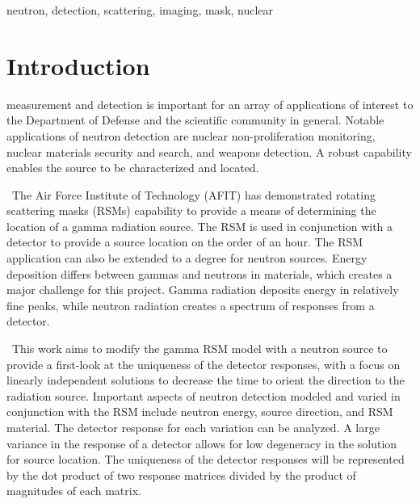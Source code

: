 \documentclass[journal]{IEEEtran}
\begin{document}
	\begin{IEEEkeywords}
		neutron, detection, scattering, imaging, mask, nuclear
	\end{IEEEkeywords}
	
	
	\IEEEpeerreviewmaketitle
	
	\section{Introduction}
	 measurement and detection is important for an array of applications of interest to the Department of Defense and the scientific community in general.  Notable applications of neutron detection are nuclear non-proliferation monitoring, nuclear materials security and search, and weapons detection.  A robust capability enables the source to be characterized and located. 
	
	\ The Air Force Institute of Technology (AFIT) has demonstrated rotating scattering masks (RSMs) capability to provide a means of determining the location of a gamma radiation source.  The RSM is used in conjunction with a detector to provide a source location on the order of an hour. The RSM application can also be extended to a degree for neutron sources.  Energy deposition differs between gammas and neutrons in materials, which creates a major challenge for this project.  Gamma radiation deposits energy in relatively fine peaks, while neutron radiation creates a spectrum of responses from a detector. 
	
	\ This work aims to modify the gamma RSM model with a neutron source to provide a first-look at the uniqueness of the detector responses, with a focus on linearly independent solutions to decrease the time to orient the direction to the radiation source.  Important aspects of neutron detection modeled and varied in conjunction with the RSM include neutron energy, source direction, and RSM material.  The detector response for each variation can be analyzed.  A large variance in the response of a detector allows for low degeneracy in the solution for source location.  The uniqueness of the detector responses will be represented by the dot product of two response matrices divided by the product of magnitudes of each matrix.   
	
\end{document}
